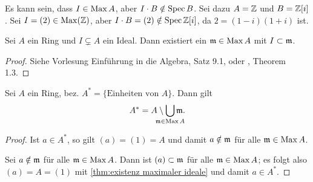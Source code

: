 \documentclass[12pt,a4paper]{scrartcl}
\theoremstyle{cplain}
\theoremstyle{cdef}
\begin{document}
\begin{bem}
	Es kann sein, dass $I \in \operatorname{Max} A$, aber $I \cdot B \notin \operatorname{Spec} B$. Sei dazu $A=\mathbb Z$ und $B=\mathbb Z[i]$. Sei $I=(2) \in \operatorname{Max}(\mathbb Z)$, aber $I \cdot B = (2) \notin \operatorname{Spec} \mathbb Z[i]$, da $2=(1-i)(1+i)$ ist.
\end{bem}
\begin{satz} \label{thm:existenz maximaler ideale}
	Sei $A$ ein Ring und $I \subsetneq A$ ein Ideal. Dann existiert ein $\mathfrak{m} \in \operatorname{Max} A$ mit $I \subset \mathfrak{m}$.
	\begin{proof}
		Siehe Vorlesung Einführung in die Algebra, Satz 9.1, oder \cite{atiyah-macdonald}, Theorem 1.3.
	\end{proof}
\end{satz}
\begin{kor} \label{kor:einheiten und maximale ideale}
    Sei $A$ ein Ring, bez. $A^*=\{\text{Einheiten von }A\}$. Dann gilt \[A^*=A \setminus \bigcup_{\mathclap{\fm \in \Max A}} \fm.\]
	\begin{proof}
		Ist $a \in A^*$, so gilt $(a)=(1)=A$ und damit $a \notin \mathfrak{m}$ für alle $\mathfrak{m} \in \operatorname{Max} A$.

		Sei $a \notin \mathfrak{m}$ für alle $\mathfrak{m} \in \operatorname{Max} A$. Dann ist $(a) \subset \mathfrak{m}$ für alle $\mathfrak{m} \in \operatorname{Max} A$; es folgt also $(a)=A=(1)$ mit \cref{thm:existenz maximaler ideale} und damit $a \in A^*$.
	\end{proof}
\end{kor}
\end{document}
